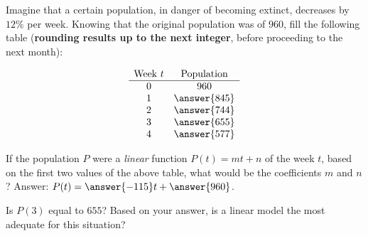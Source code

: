 \documentclass{ximera}
\author{Ivo Terek}
\begin{document}
\begin{exercise}

 Imagine that a certain population, in danger of becoming extinct, decreases by $12\%$ per week. Knowing that the original population was of $960$, fill the following table (\textbf{rounding results up to the next integer}, before proceeding to the next month):

  $$
\begin{array}{cc}
\text{Week } t& \text{Population}\\
\hline
0 & 960 \\
1& \answer{845}\\
2& \answer{744}\\
3& \answer{655}\\
4&\answer{577}
\end{array}
$$

\begin{exercise}
  If the population $P$ were a \emph{linear} function $P(t) = mt+n$ of the week $t$, based on the first two values of the above table, what would be the coefficients $m$ and $n$? Answer: $P(t) = \answer{-115}t+\answer{960}$.

  \begin{exercise}
    Is $P(3)$ equal to $655$? Based on your answer, is a linear model the most adequate for this situation?
    \begin{multipleChoice}
    \end{multipleChoice}
  \end{exercise}
  
\end{exercise}

\end{exercise}
\end{document}
